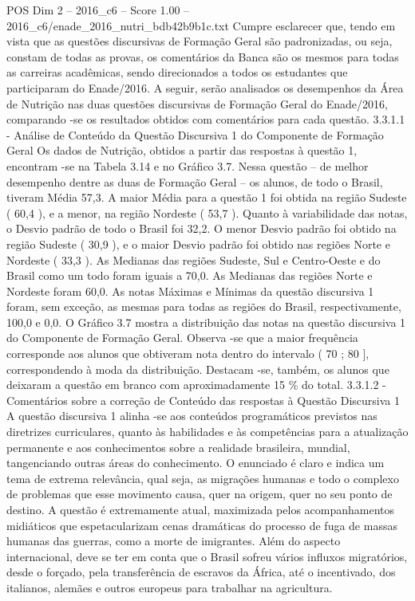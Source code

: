 \begin{textsample}{POS Dim 2 – 2016\_c6 – Score 1.00 – 2016\_c6/enade\_2016\_nutri\_bdb42b9b1c.txt}
Cumpre esclarecer que, tendo em vista que as questões discursivas de Formação Geral são padronizadas, ou seja, constam de todas as provas, os comentários da Banca são os mesmos para todas as carreiras acadêmicas, sendo direcionados a todos os estudantes que participaram do Enade/2016.
A seguir, serão analisados os desempenhos da Área de Nutrição nas duas questões discursivas de Formação Geral do Enade/2016, comparando -se os resultados obtidos com comentários para cada questão. 3.3.1.1 - Análise de Conteúdo da Questão Discursiva 1 do Componente de Formação Geral Os dados de Nutrição, obtidos a partir das respostas à questão 1, encontram -se na Tabela 3.14 e no Gráfico 3.7.
Nessa questão – de melhor desempenho dentre as duas de Formação Geral – os alunos, de todo o Brasil, tiveram Média 57,3.
A maior Média para a questão 1 foi obtida na região Sudeste ( 60,4 ), e a menor, na região Nordeste ( 53,7 ).
Quanto à variabilidade das notas, o Desvio padrão de todo o Brasil foi 32,2.
O menor Desvio padrão foi obtido na região Sudeste ( 30,9 ), e o maior Desvio padrão foi obtido nas regiões Norte e Nordeste ( 33,3 ).
As Medianas das regiões Sudeste, Sul e Centro-Oeste e do Brasil como um todo foram iguais a 70,0.
As Medianas das regiões Norte e Nordeste foram 60,0.
As notas Máximas e Mínimas da questão discursiva 1 foram, sem exceção, as mesmas para todas as regiões do Brasil, respectivamente, 100,0 e 0,0.
O Gráfico 3.7 mostra a distribuição das notas na questão discursiva 1 do Componente de Formação Geral.
Observa -se que a maior frequência corresponde aos alunos que obtiveram nota dentro do intervalo ( 70 ; 80 ], correspondendo à moda da distribuição.
Destacam -se, também, os alunos que deixaram a questão em branco com aproximadamente 15 \% do total. 3.3.1.2 - Comentários sobre a correção de Conteúdo das respostas à Questão Discursiva 1 A questão discursiva 1 alinha -se aos conteúdos programáticos previstos nas diretrizes curriculares, quanto às habilidades e às competências para a atualização permanente e aos conhecimentos sobre a realidade brasileira, mundial, tangenciando outras áreas do conhecimento.
O enunciado é claro e indica um tema de extrema relevância, qual seja, as migrações humanas e todo o complexo de problemas que esse movimento causa, quer na origem, quer no seu ponto de destino.
A questão é extremamente atual, maximizada pelos acompanhamentos midiáticos que espetacularizam cenas dramáticas do processo de fuga de massas humanas das guerras, como a morte de imigrantes.
Além do aspecto internacional, deve se ter em conta que o Brasil sofreu vários influxos migratórios, desde o forçado, pela transferência de escravos da África, até o incentivado, dos italianos, alemães e outros europeus para trabalhar na agricultura.

\end{textsample}
